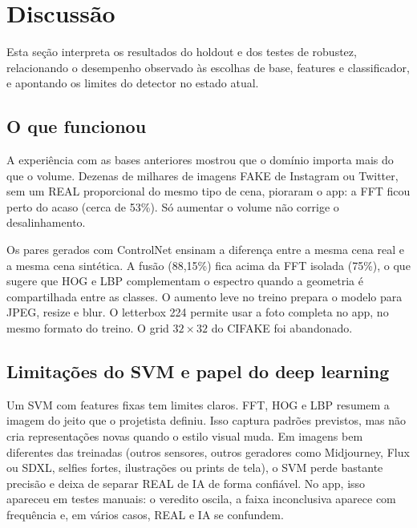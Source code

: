 \documentclass[12pt]{article}
\begin{document}
\section{Discussão}
\label{sec:discussao}

Esta seção interpreta os resultados do holdout e dos testes de robustez, relacionando o desempenho observado às escolhas de base, features e classificador, e apontando os limites do detector no estado atual.

\subsection{O que funcionou}

A experiência com as bases anteriores mostrou que o domínio importa mais do que o volume. Dezenas de milhares de imagens FAKE de Instagram ou Twitter, sem um REAL proporcional do mesmo tipo de cena, pioraram o app: a FFT ficou perto do acaso (cerca de 53\%). Só aumentar o volume não corrige o desalinhamento.

Os pares gerados com ControlNet ensinam a diferença entre a mesma cena real e a mesma cena sintética. A fusão (88,15\%) fica acima da FFT isolada (75\%), o que sugere que HOG e LBP complementam o espectro quando a geometria é compartilhada entre as classes. O aumento leve no treino prepara o modelo para JPEG, resize e blur. O letterbox 224 permite usar a foto completa no app, no mesmo formato do treino. O grid $32{\times}32$ do CIFAKE foi abandonado.

\subsection{Limitações do SVM e papel do deep learning}

Um SVM com features fixas tem limites claros. FFT, HOG e LBP resumem a imagem do jeito que o projetista definiu. Isso captura padrões previstos, mas não cria representações novas quando o estilo visual muda. Em imagens bem diferentes das treinadas (outros sensores, outros geradores como Midjourney, Flux ou SDXL, selfies fortes, ilustrações ou prints de tela), o SVM perde bastante precisão e deixa de separar REAL de IA de forma confiável. No app, isso apareceu em testes manuais: o veredito oscila, a faixa inconclusiva aparece com frequência e, em vários casos, REAL e IA se confundem.
\end{document}
